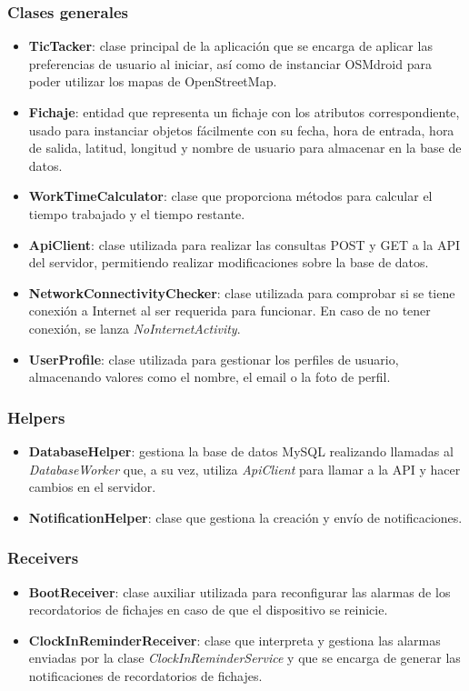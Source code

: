 \subsubsection{Clases generales}
\begin{itemize}
  \item \textbf{TicTacker}: clase principal de la aplicación que se encarga de aplicar las preferencias de usuario al iniciar, así como de instanciar OSMdroid para poder utilizar los mapas de OpenStreetMap.
  \item \textbf{Fichaje}: entidad que representa un fichaje con los atributos correspondiente, usado para instanciar objetos fácilmente con su fecha, hora de entrada, hora de salida, latitud, longitud y nombre de usuario para almacenar en la base de datos.
  \item \textbf{WorkTimeCalculator}: clase que proporciona métodos para calcular el tiempo trabajado y el tiempo restante.
  \item \textbf{ApiClient}: clase utilizada para realizar las consultas POST y GET a la API del servidor, permitiendo realizar modificaciones sobre la base de datos.
  \item \textbf{NetworkConnectivityChecker}: clase utilizada para comprobar si se tiene conexión a Internet al ser requerida para funcionar. En caso de no tener conexión, se lanza \textit{NoInternetActivity}.
  \item \textbf{UserProfile}: clase utilizada para gestionar los perfiles de usuario, almacenando valores como el nombre, el email o la foto de perfil.
\end{itemize}

\subsubsection{Helpers}
\begin{itemize}
  \item \textbf{DatabaseHelper}: gestiona la base de datos MySQL realizando llamadas al \textit{DatabaseWorker} que, a su vez, utiliza \textit{ApiClient} para llamar a la API y hacer cambios en el servidor.
  \item \textbf{NotificationHelper}: clase que gestiona la creación y envío de notificaciones.
\end{itemize}

\subsubsection{Receivers}
\begin{itemize}
  \item \textbf{BootReceiver}: clase auxiliar utilizada para reconfigurar las alarmas de los recordatorios de fichajes en caso de que el dispositivo se reinicie.
  \item \textbf{ClockInReminderReceiver}: clase que interpreta y gestiona las alarmas enviadas por la clase \textit{ClockInReminderService} y que se encarga de generar las notificaciones de recordatorios de fichajes.
\end{itemize}

